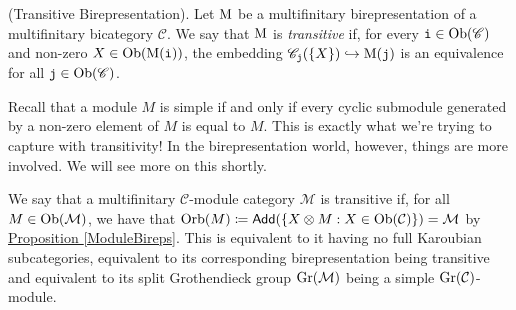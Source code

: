 \noindent\begin{definition}\textup{(Transitive Birepresentation).} Let $\textup{M}$ be a multifinitary birepresentation of a multifinitary bicategory $\mathscr{C}$. We say that $\textup{M}$ is {\em transitive} if, %
for every $\textup{\texttt{i}} \in \textup{Ob}(\mathscr{C})$ and non-zero $X \in \textup{Ob}(\textup{M}(\textup{\texttt{i}}))$, the embedding $\mathscr{C}_{\textup{\texttt{j}}}(\{X\}) \hookrightarrow \textup{M}(\textup{\texttt{j}})$ is an equivalence for all $\textup{\texttt{j}} \in \textup{Ob}(\mathscr{C})$.\\
\end{definition}
\newpage

\noindent\begin{remark} Recall that a module $M$ is simple if and only if every cyclic submodule generated by a non-zero element of $M$ is equal to $M$. This is exactly what we're trying to capture with transitivity! In the birepresentation world, however, things are more involved. We will see more on this shortly.\\%
\end{remark}

\noindent We say that a multifinitary $\mathcal{C}$-module category $\mathcal{M}$ is transitive if, for all $M \in \textup{Ob}(\mathcal{M})$, we have that $\textup{Orb}(M) \coloneqq \textsf{Add}(\{X \otimes M : X \in \textup{Ob}(\mathcal{C})\}) = \mathcal{M}$ by \hyperref[ModuleBireps]{Proposition \ref*{ModuleBireps}}. This is equivalent to it having no full Karoubian subcategories, equivalent to its corresponding birepresentation being transitive and equivalent to its split Grothendieck group $\textup{Gr}(\mathcal{M})$ being a simple $\textup{Gr}(\mathcal{C})$-module.\\


